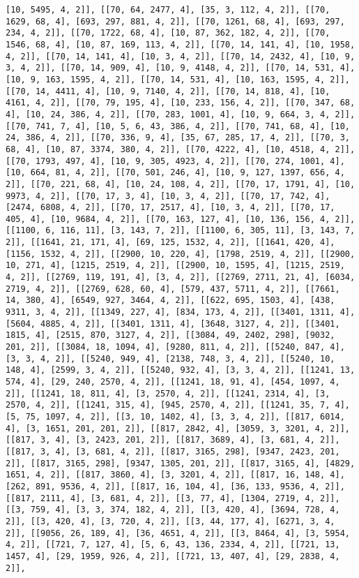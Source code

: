\documentclass[12pt,fleqn]{article}\usepackage{../../common}
\begin{document}
\begin{verbatim}
[10, 5495, 4, 2]], [[70, 64, 2477, 4], [35, 3, 112, 4, 2]], [[70, 1629, 68, 4], [693, 297, 881, 4, 2]], [[70, 1261, 68, 4], [693, 297, 234, 4, 2]], [[70, 1722, 68, 4], [10, 87, 362, 182, 4, 2]], [[70, 1546, 68, 4], [10, 87, 169, 113, 4, 2]], [[70, 14, 141, 4], [10, 1958, 4, 2]], [[70, 14, 141, 4], [10, 3, 4, 2]], [[70, 14, 2432, 4], [10, 9, 3, 4, 2]], [[70, 14, 909, 4], [10, 9, 4148, 4, 2]], [[70, 14, 531, 4], [10, 9, 163, 1595, 4, 2]], [[70, 14, 531, 4], [10, 163, 1595, 4, 2]], [[70, 14, 4411, 4], [10, 9, 7140, 4, 2]], [[70, 14, 818, 4], [10, 4161, 4, 2]], [[70, 79, 195, 4], [10, 233, 156, 4, 2]], [[70, 347, 68, 4], [10, 24, 386, 4, 2]], [[70, 283, 1001, 4], [10, 9, 664, 3, 4, 2]], [[70, 741, 7, 4], [10, 5, 6, 43, 386, 4, 2]], [[70, 741, 68, 4], [10, 24, 386, 4, 2]], [[70, 336, 9, 4], [35, 67, 285, 17, 4, 2]], [[70, 3, 68, 4], [10, 87, 3374, 380, 4, 2]], [[70, 4222, 4], [10, 4518, 4, 2]], [[70, 1793, 497, 4], [10, 9, 305, 4923, 4, 2]], [[70, 274, 1001, 4], [10, 664, 81, 4, 2]], [[70, 501, 246, 4], [10, 9, 127, 1397, 656, 4, 2]], [[70, 221, 68, 4], [10, 24, 108, 4, 2]], [[70, 17, 1791, 4], [10, 9973, 4, 2]], [[70, 17, 3, 4], [10, 3, 4, 2]], [[70, 17, 742, 4], [2474, 6808, 4, 2]], [[70, 17, 2517, 4], [10, 3, 4, 2]], [[70, 17, 405, 4], [10, 9684, 4, 2]], [[70, 163, 127, 4], [10, 136, 156, 4, 2]], [[1100, 6, 116, 11], [3, 143, 7, 2]], [[1100, 6, 305, 11], [3, 143, 7, 2]], [[1641, 21, 171, 4], [69, 125, 1532, 4, 2]], [[1641, 420, 4], [1156, 1532, 4, 2]], [[2900, 10, 220, 4], [1798, 2519, 4, 2]], [[2900, 10, 271, 4], [1215, 2519, 4, 2]], [[2900, 10, 1595, 4], [1215, 2519, 4, 2]], [[2769, 119, 191, 4], [3, 4, 2]], [[2769, 2711, 21, 4], [6034, 2719, 4, 2]], [[2769, 628, 60, 4], [579, 437, 5711, 4, 2]], [[7661, 14, 380, 4], [6549, 927, 3464, 4, 2]], [[622, 695, 1503, 4], [438, 9311, 3, 4, 2]], [[1349, 227, 4], [834, 173, 4, 2]], [[3401, 1311, 4], [5604, 4885, 4, 2]], [[3401, 1311, 4], [3648, 3127, 4, 2]], [[3401, 1815, 4], [2515, 870, 3127, 4, 2]], [[3084, 49, 2402, 298], [9032, 201, 2]], [[3084, 18, 1094, 4], [9280, 811, 4, 2]], [[5240, 847, 4], [3, 3, 4, 2]], [[5240, 949, 4], [2138, 748, 3, 4, 2]], [[5240, 10, 148, 4], [2599, 3, 4, 2]], [[5240, 932, 4], [3, 3, 4, 2]], [[1241, 13, 574, 4], [29, 240, 2570, 4, 2]], [[1241, 18, 91, 4], [454, 1097, 4, 2]], [[1241, 18, 811, 4], [3, 2570, 4, 2]], [[1241, 2314, 4], [3, 2570, 4, 2]], [[1241, 315, 4], [945, 2570, 4, 2]], [[1241, 35, 7, 4], [5, 75, 1097, 4, 2]], [[3, 10, 1402, 4], [3, 3, 4, 2]], [[817, 6014, 4], [3, 1651, 201, 201, 2]], [[817, 2842, 4], [3059, 3, 3201, 4, 2]], [[817, 3, 4], [3, 2423, 201, 2]], [[817, 3689, 4], [3, 681, 4, 2]], [[817, 3, 4], [3, 681, 4, 2]], [[817, 3165, 298], [9347, 2423, 201, 2]], [[817, 3165, 298], [9347, 1305, 201, 2]], [[817, 3165, 4], [4829, 1651, 4, 2]], [[817, 3860, 4], [3, 3201, 4, 2]], [[817, 16, 148, 4], [262, 891, 9536, 4, 2]], [[817, 16, 104, 4], [36, 133, 9536, 4, 2]], [[817, 2111, 4], [3, 681, 4, 2]], [[3, 77, 4], [1304, 2719, 4, 2]], [[3, 759, 4], [3, 3, 374, 182, 4, 2]], [[3, 420, 4], [3694, 728, 4, 2]], [[3, 420, 4], [3, 720, 4, 2]], [[3, 44, 177, 4], [6271, 3, 4, 2]], [[9056, 26, 189, 4], [36, 4651, 4, 2]], [[3, 8464, 4], [3, 5954, 4, 2]], [[721, 7, 127, 4], [5, 6, 43, 136, 2334, 4, 2]], [[721, 13, 1457, 4], [29, 1959, 926, 4, 2]], [[721, 13, 407, 4], [29, 2838, 4, 2]], 
\end{verbatim}
\end{document}
